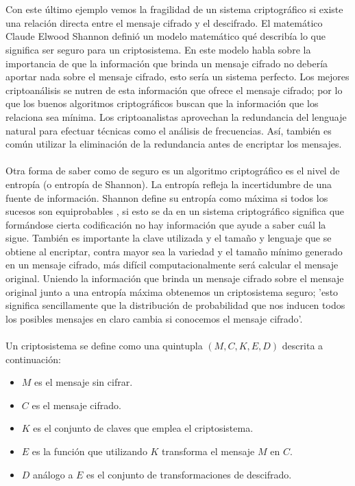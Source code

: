 \documentclass[../PFC.tex]{subfiles}
\begin{document}
\\\\
Con este último ejemplo vemos la fragilidad de un sistema criptográfico si existe una relación directa entre el mensaje cifrado y el descifrado. El matemático Claude Elwood Shannon definió un modelo matemático qué describía lo que significa ser seguro para un criptosistema\cite{bruce}. En este modelo habla sobre la importancia de que la información que brinda un mensaje cifrado no debería aportar nada sobre el mensaje cifrado, esto sería un sistema perfecto. Los mejores criptoanálisis se nutren de esta información que ofrece el mensaje cifrado; por lo que los buenos algoritmos criptográficos buscan que la información que los relaciona sea mínima. Los criptoanalistas aprovechan la redundancia del lenguaje natural para efectuar técnicas como el análisis de frecuencias. Así, también es común utilizar la eliminación de la redundancia antes de encriptar los mensajes.
\\\\
Otra forma de saber como de seguro es un algoritmo criptográfico es el nivel de entropía (o entropía de Shannon). La entropía refleja la incertidumbre de una fuente de información. Shannon define su entropía como máxima si todos los sucesos son equiprobables \cite{shannon2001mathematical}, si esto se da en un sistema criptográfico significa que formándose cierta codificación no hay información que ayude a saber cuál la sigue. También es importante la clave utilizada y el tamaño y lenguaje que se obtiene al encriptar, contra mayor sea la variedad y el tamaño mínimo generado en un mensaje cifrado, más difícil computacionalmente será calcular el mensaje original. Uniendo la información que brinda un mensaje cifrado sobre el mensaje original junto a una entropía máxima obtenemos un criptosistema seguro; 'esto significa sencillamente que la distribución de probabilidad que nos inducen todos los posibles mensajes en claro cambia si conocemos el mensaje cifrado'\cite{lucena}.
\\\\
Un criptosistema se define como una quintupla $(M,C,K,E,D)$ descrita a continuación\cite{lucena}:

\begin{itemize}
\item{$M$ es el mensaje sin cifrar.}
\item{$C$ es el mensaje cifrado.}
\item{$K$ es el conjunto de claves que emplea el criptosistema.}
\item{$E$ es la función que utilizando $K$ transforma el mensaje $M$ en $C$.}
\item{$D$ análogo a $E$ es el conjunto de transformaciones de descifrado.}
\end{itemize}
\end{document}
